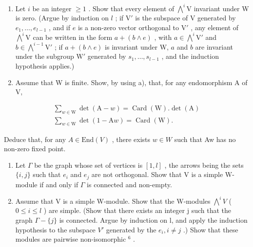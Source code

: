\begin{enumerate}
\def\labelenumi{\alph{enumi})}
\item
  Let \(i\) be an integer \(\geqslant 1\) . Show that every element of \(\bigwedge^{i}\mathrm{V}\) invariant under W is zero. (Argue by induction on \(l\) ; if \(\mathrm{V}'\) is the subspace of V generated by \(e_1, \ldots, e_{l-1}\) , and if \(e\) is a non-zero vector orthogonal to \(\mathrm{V}'\) , any element of \(\bigwedge^{i}\mathrm{V}\) can be written in the form \(a + (b \wedge e)\) , with \(a \in \bigwedge^{i}\mathrm{V}'\) and \(b \in \bigwedge^{i-1}\mathrm{V}'\) ; if \(a + (b \wedge e)\) is invariant under W, \(a\) and \(b\) are invariant under the subgroup \(\mathrm{W}'\) generated by \(s_1, \ldots, s_{l-1}\) , and the induction hypothesis applies.)
\item
  Assume that W is finite. Show, by using a), that, for any endomorphism A of V,
\end{enumerate}

\[
\begin{array}{c} \sum_ {w \in \mathrm{W}} \det (\mathrm{A} - w) = \operatorname{Card} (\mathrm{W}). \det (\mathrm{A}) \\ \sum_ {w \in \mathrm{W}} \det (1 - \mathrm{A} w) = \operatorname{Card} (\mathrm{W}). \end{array}
\]

Deduce that, for any \(A \in \text{End}(V)\) , there exists \(w \in W\) such that Aw has no non-zero fixed point.

\begin{enumerate}
\def\labelenumi{\alph{enumi})}
\setcounter{enumi}{2}
\item
  Let \(\Gamma\) be the graph whose set of vertices is \([1,l]\) , the arrows being the sets \(\{i,j\}\) such that \(e_{i}\) and \(e_{j}\) are not orthogonal. Show that V is a simple W-module if and only if \(\Gamma\) is connected and non-empty.
\item
  Assume that V is a simple W-module. Show that the W-modules \(\bigwedge^{i}V\) ( \(0 \leqslant i \leqslant l\) ) are simple. (Show that there exists an integer j such that the graph \(\Gamma - \{j\}\) is connected. Argue by induction on l, and apply the induction hypothesis to the subspace \(V'\) generated by the \(e_{i}, i \neq j\) .) Show that these modules are pairwise non-isomorphic \(^{6}\) .
\end{enumerate}

